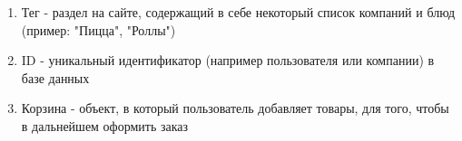 \begin{enumerate}
  \item Тег - раздел на сайте, содержащий в себе некоторый список компаний и блюд
  (пример: "Пицца", "Роллы")
  \item ID - уникальный идентификатор (например пользователя или компании) в базе данных
  \item Корзина - объект, в который пользователь добавляет товары, для того, чтобы в
  дальнейшем оформить заказ
\end{enumerate}
